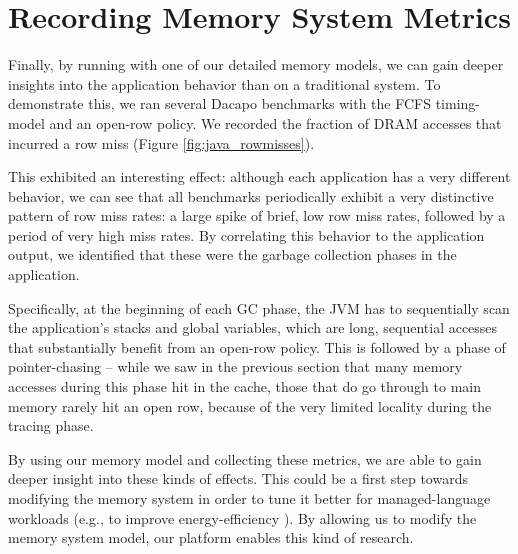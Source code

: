 \section{Recording Memory System Metrics}

Finally, by running with one of our detailed memory models, we can gain deeper
insights into the application behavior than on a traditional system. To
demonstrate this, we ran several Dacapo benchmarks with the FCFS timing-model
and an open-row policy. We recorded the fraction of DRAM accesses that incurred
a row miss (Figure \ref{fig:java_rowmisses}).

This exhibited an interesting effect: although each application has a very
different behavior, we can see that all benchmarks periodically exhibit a very
distinctive pattern of row miss rates: a large spike of brief, low row miss
rates, followed by a period of very high miss rates. By correlating this
behavior to the application output, we identified that these were the garbage
collection phases in the application.

Specifically, at the beginning of each GC phase, the JVM has to sequentially
scan the application's stacks and global variables, which are long, sequential
accesses that substantially benefit from an open-row policy. This is followed
by a phase of pointer-chasing -- while we saw in the previous section that many
memory accesses during this phase hit in the cache, those that do go through to
main memory rarely hit an open row, because of the very limited locality during
the tracing phase.

By using our memory model and collecting these metrics, we are able to gain
deeper insight into these kinds of effects. This could be a first step towards
modifying the memory system in order to tune it better for managed-language
workloads (e.g., to improve energy-efficiency
\cite{Cao:2012:YYP:2337159.2337185}). By allowing us to modify the memory
system model, our platform enables this kind of research.

